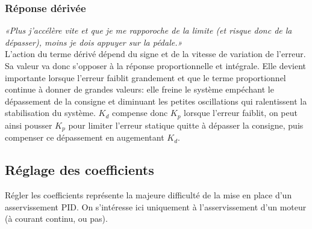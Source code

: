             \subsubsection{Réponse dérivée}
                \textit{«Plus j'accélère vite et que je me rapporoche de la limite (et risque donc de la dépasser), moins je dois appuyer sur la pédale.»}\\
                L'action du terme dérivé dépend du signe et de la vitesse de variation de l'erreur. Sa valeur va donc s'opposer à la réponse proportionnelle et intégrale. Elle devient importante lorsque l'erreur faiblit grandement et que le terme proportionnel continue à donner de grandes valeurs: elle freine le système empéchant le dépassement de la consigne et diminuant les petites oscillations qui ralentissent la stabilisation du système. $K_d$ compense donc $K_p$ lorsque l'erreur faiblit, on peut ainsi pousser $K_p$ pour limiter l'erreur statique quitte à dépasser la consigne, puis compenser ce dépassement en augementant $K_d$.

        \newpage

        \subsection{Réglage des coefficients}
            Régler les coefficients représente la majeure difficulté de la mise en place d'un asservissement PID. On s'intéresse ici uniquement à l'asservissement d'un moteur (à courant continu, ou pas).

